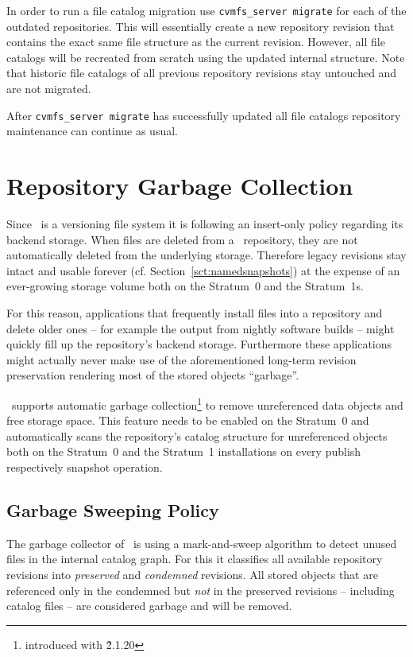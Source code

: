 In order to run a file catalog migration use \texttt{cvmfs\_server migrate} for each of the outdated repositories.
This will essentially create a new repository revision that contains the exact same  file structure as the current revision.
However, all file catalogs will be recreated from scratch using the updated internal structure.
Note that historic file catalogs of all previous repository revisions stay untouched and are not migrated.

After \texttt{cvmfs\_server migrate} has successfully updated all file catalogs repository maintenance can continue as usual.



\section{Repository Garbage Collection}
\label{sct:garbagecollection}
Since \cvmfs\ is a versioning file system it is following an insert-only policy regarding its backend storage.
When files are deleted from a \cvmfs\ repository, they are not automatically deleted from the underlying storage.
Therefore legacy revisions stay intact and usable forever (cf. Section~\ref{sct:namedsnapshots}) at the expense of an ever-growing storage volume both on the Stratum~0 and the Stratum~1s.

For this reason, applications that frequently install files into a repository and delete older ones -- for example the output from nightly software builds -- might quickly fill up the repository's backend storage.
Furthermore these applications might actually never make use of the aforementioned long-term revision preservation rendering most of the stored objects ``garbage''.

\cvmfs\ supports automatic garbage collection\footnote{introduced with \cvmfs\~2.1.20} to remove unreferenced data objects and free storage space.
This feature needs to be enabled on the Stratum~0 and automatically scans the repository's catalog structure for unreferenced objects both on the Stratum~0 and the Stratum~1 installations on every publish respectively snapshot operation.

\subsection{Garbage Sweeping Policy}
The garbage collector of \cvmfs\ is using a mark-and-sweep algorithm to detect unused files in the internal catalog graph.
For this it classifies all available repository revisions into \emph{preserved} and \emph{condemned} revisions.
All stored objects that are referenced only in the condemned but \emph{not} in the preserved revisions -- including catalog files -- are considered garbage and will be removed.

